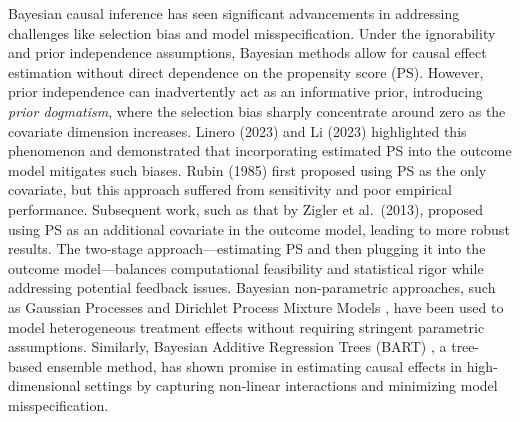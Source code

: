 \documentclass[useAMS,referee]{biom}
\begin{document}
 Bayesian causal inference has seen significant advancements in addressing challenges like selection bias and model misspecification. Under the ignorability and prior independence assumptions, Bayesian methods allow for causal effect estimation without direct dependence on the propensity score (PS). However, prior independence can inadvertently act as an informative prior, introducing \emph{prior dogmatism}, where the selection bias sharply concentrate around zero as the covariate dimension increases. Linero (2023)\parencite{linero2022causal} and Li (2023)\parencite{li2023bayesian}  highlighted this phenomenon and demonstrated that incorporating estimated PS into the outcome model mitigates such biases. Rubin (1985) \cite{rubin1985propensity} first proposed using PS as the only covariate, but this approach suffered from sensitivity and poor empirical performance. Subsequent work, such as that by Zigler et al.\ (2013)\parencite{zigler2013model}, proposed using PS as an additional covariate in the outcome model, leading to more robust results. The two-stage approach---estimating PS and then plugging it into the outcome model---balances computational feasibility and statistical rigor while addressing potential feedback issues. Bayesian non-parametric approaches, such as Gaussian Processes \parencite{xu2017bayesian} and Dirichlet Process Mixture Models \parencite{kim2013bayesian}, have been used to model heterogeneous treatment effects without requiring stringent parametric assumptions. Similarly, Bayesian Additive Regression Trees (BART) \parencite{hill2011bayesian, Chipman10}, a tree-based ensemble method, has shown promise in estimating causal effects in high-dimensional settings by capturing non-linear interactions and minimizing model misspecification.
\end{document}
